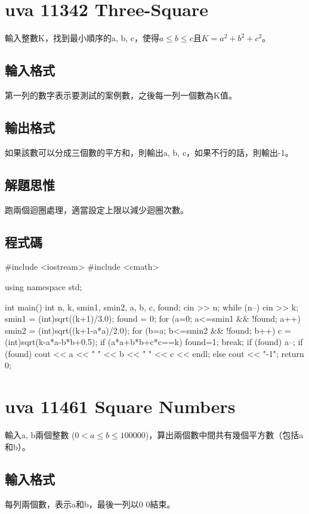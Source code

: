 \section{uva 11342 Three-Square}
輸入整數K，找到最小順序的a, b, c，使得$a\le b\le c$且$K=a^2+b^2+c^2$。

\subsection{輪入格式}
第一列的數字表示要測試的案例數，之後每一列一個數為K值。

\subsection{輸出格式}
如果該數可以分成三個數的平方和，則輸出a, b, c，如果不行的話，則輸出-1。

\subsection{解題思惟}
跑兩個迴圈處理，適當設定上限以減少迴圈次數。

\subsection{程式碼}
\begin{cppcode}
#include <iostream>
#include <cmath>

using namespace std;

int main()
{
	int n, k, smin1, smin2, a, b, c, found;
	cin >> n;
	while (n--) {
		cin >> k;
		smin1 = (int)sqrt((k+1)/3.0);
		found = 0;
		for (a=0; a<=smin1 && !found; a++) {
			smin2 = (int)sqrt((k+1-a*a)/2.0);
			for (b=a; b<=smin2 && !found; b++) {
				c = (int)sqrt(k-a*a-b*b+0.5);
				if (a*a+b*b+c*c==k) { found=1; break; }
			}
			if (found) a--;
		}
		if (found) cout << a << " " << b << " " << c << endl;
		else cout << "-1\n";           
	}
	return 0;
}
\end{cppcode}

\section{uva 11461 Square Numbers}
輸入a, b兩個整數 ($0<a\le b\le 100000$)，算出兩個數中間共有幾個平方數（包括a和b）。

\subsection{輸入格式}
每列兩個數，表示a和b，最後一列以0 0結束。

